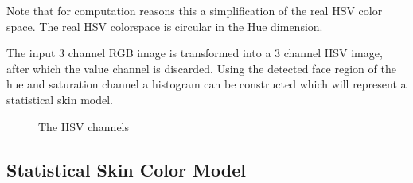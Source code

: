 Note that for computation reasons this a simplification of the real HSV color space. The real HSV colorspace is circular in the Hue dimension.

The input 3 channel RGB image is transformed into a 3 channel HSV image, after which the value channel is discarded. Using the detected face region of the hue and saturation channel a histogram can be constructed which will represent a statistical skin model.

\begin{figure}[tb]
  \centering
{}
\hspace{0.03\linewidth}
\hspace{0.03\linewidth}
  \caption{The HSV channels}
  \label{fig:hsvchannels}
\end{figure}




\subsection*{Statistical Skin Color Model}

